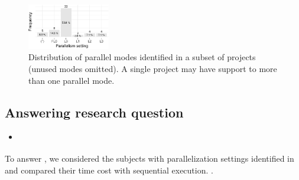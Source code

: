 \begin{figure}[h!]
    \centering
    \includegraphics[width=0.32\textwidth]{plots/barplot-modes.pdf}
    \caption{\label{fig:freqmodes}Distribution of parallel modes
    identified in a subset of \numProjectsPar{} projects (unused modes
    omitted). A single project may have support to more than one
    parallel mode.}
\end{figure}

\subsection{Answering research question \numRQD{}}
\label{sec:rqD}

\begin{itemize}
    \item \emph{\RQD}
\end{itemize}

To answer \numRQD{}, we considered the \numProjectsPar{} subjects with
parallelization settings identified in \numRQC{} and compared their
time cost with sequential execution.  
.

\Fix{---------------------}


